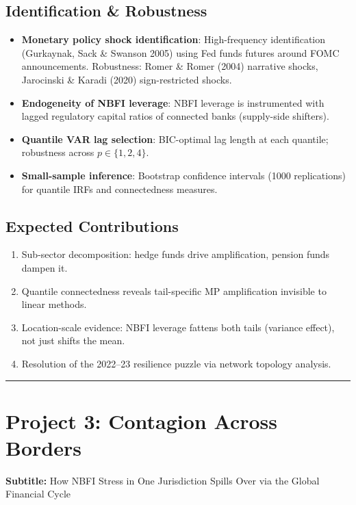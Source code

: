 \documentclass[11pt,a4paper]{article}
\begin{document}
\subsection{Identification \& Robustness}

\begin{itemize}
\item \textbf{Monetary policy shock identification}: High-frequency identification (Gurkaynak, Sack \& Swanson 2005) using Fed funds futures around FOMC announcements. Robustness: Romer \& Romer (2004) narrative shocks, Jarocinski \& Karadi (2020) sign-restricted shocks.
\item \textbf{Endogeneity of NBFI leverage}: NBFI leverage is instrumented with lagged regulatory capital ratios of connected banks (supply-side shifters).
\item \textbf{Quantile VAR lag selection}: BIC-optimal lag length at each quantile; robustness across $p \in \{1, 2, 4\}$.
\item \textbf{Small-sample inference}: Bootstrap confidence intervals (1000 replications) for quantile IRFs and connectedness measures.

\end{itemize}

\subsection{Expected Contributions}

\begin{enumerate}
\item Sub-sector decomposition: hedge funds drive amplification, pension funds dampen it.
\item Quantile connectedness reveals tail-specific MP amplification invisible to linear methods.
\item Location-scale evidence: NBFI leverage fattens both tails (variance effect), not just shifts the mean.
\item Resolution of the 2022--23 resilience puzzle via network topology analysis.

\end{enumerate}

\bigskip\noindent\rule{\textwidth}{0.4pt}\bigskip


\section{Project 3: Contagion Across Borders}

\textbf{Subtitle:} How NBFI Stress in One Jurisdiction Spills Over via the Global Financial Cycle
\end{document}
